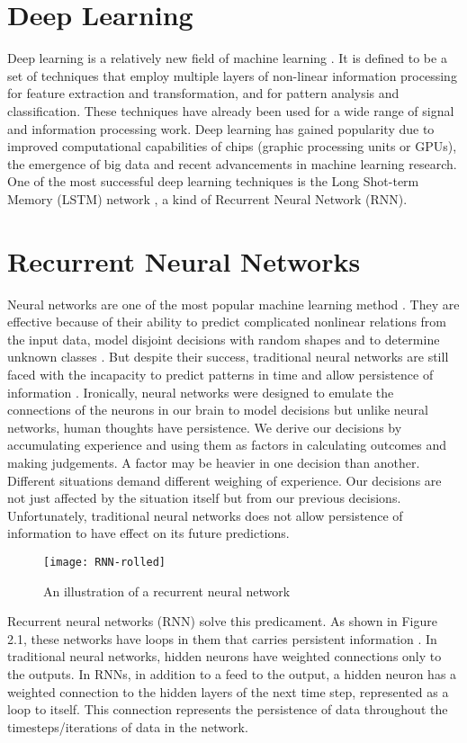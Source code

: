 \section{Deep Learning}
    Deep learning is a relatively new field of machine learning \citep{deng2014deep}. It is defined to be a set of techniques that employ multiple layers of non-linear information processing for feature extraction and transformation, and for pattern analysis and classification. These techniques have already been used for a wide range of signal and information processing work. Deep learning has gained popularity due to improved computational capabilities of chips (graphic processing units or GPUs), the emergence of big data and recent advancements in machine learning research. One of the most successful deep learning techniques is the Long Shot-term Memory (LSTM) network \citep{schmidhuber2015deep}, a kind of Recurrent Neural Network (RNN).

\section{Recurrent Neural Networks}
    Neural networks are one of the most popular machine learning method \citep{razi2005comparative}. They are effective because of their ability to predict complicated nonlinear relations from the input data, model disjoint decisions with random shapes and to determine unknown classes \citep{huang2006real}. But despite their success, traditional neural networks are still faced with the incapacity to predict patterns in time and allow persistence of information \citep{patan2008artificial}. Ironically, neural networks were designed to emulate the connections of the neurons in our brain to model decisions but unlike neural networks, human thoughts have persistence. We derive our decisions by accumulating experience and using them as factors in calculating outcomes and making judgements. A factor may be heavier in one decision than another. Different situations demand different weighing of experience. Our decisions are not just affected by the situation itself but from our previous decisions. Unfortunately, traditional neural networks does not allow persistence of information to have effect on its future predictions.

    \begin{figure}[H]
    \centering
    \texttt{[image: RNN-rolled]}
    \caption{An illustration of a recurrent neural network \citep{olah2015understanding}}
    \end{figure}
    Recurrent neural networks (RNN) solve this predicament. As shown in Figure 2.1, these networks have loops in them that carries persistent information \citep{mikolov2010recurrent}. In traditional neural networks, hidden neurons have weighted connections only to the outputs. In RNNs, in addition to a feed to the output, a hidden neuron has a weighted connection to the hidden layers of the next time step, represented as a loop to itself. This connection represents the persistence of data throughout the timesteps/iterations of data in the network.

